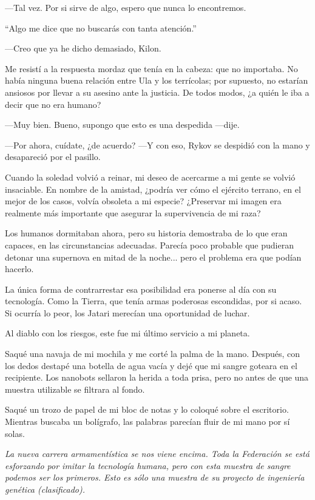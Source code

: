 —Tal vez. Por si sirve de algo, espero que nunca lo encontremos.

``Algo me dice que no buscarás con tanta atención.''

—Creo que ya he dicho demasiado, Kilon.

Me resistí a la respuesta mordaz que tenía en la cabeza: que no importaba. No había ninguna buena relación entre Ula y los terrícolas; por supuesto, no estarían ansiosos por llevar a su asesino ante la justicia. De todos modos, ¿a quién le iba a decir que no era humano?

—Muy bien. Bueno, supongo que esto es una despedida —dije.

—Por ahora, cuídate, ¿de acuerdo? —Y con eso, Rykov se despidió con la mano y desapareció por el pasillo.

Cuando la soledad volvió a reinar, mi deseo de acercarme a mi gente se volvió insaciable. En nombre de la amistad, ¿podría ver cómo el ejército terrano, en el mejor de los casos, volvía obsoleta a mi especie? ¿Preservar mi imagen era realmente más importante que asegurar la supervivencia de mi raza?

Los humanos dormitaban ahora, pero su historia demostraba de lo que eran capaces, en las circunstancias adecuadas. Parecía poco probable que pudieran detonar una supernova en mitad de la noche... pero el problema era que podían hacerlo.

La única forma de contrarrestar esa posibilidad era ponerse al día con su tecnología. Como la Tierra, que tenía armas poderosas escondidas, por si acaso. Si ocurría lo peor, los Jatari merecían una oportunidad de luchar.

Al diablo con los riesgos, este fue mi último servicio a mi planeta.

Saqué una navaja de mi mochila y me corté la palma de la mano. Después, con los dedos destapé una botella de agua vacía y dejé que mi sangre goteara en el recipiente. Los nanobots sellaron la herida a toda prisa, pero no antes de que una muestra utilizable se filtrara al fondo.

Saqué un trozo de papel de mi bloc de notas y lo coloqué sobre el escritorio. Mientras buscaba un bolígrafo, las palabras parecían fluir de mi mano por sí solas.

\textit{La nueva carrera armamentística se nos viene encima. Toda la Federación se está esforzando por imitar la tecnología humana, pero con esta muestra de sangre podemos ser los primeros. Esto es sólo una muestra de su proyecto de ingeniería genética (clasificado).}

